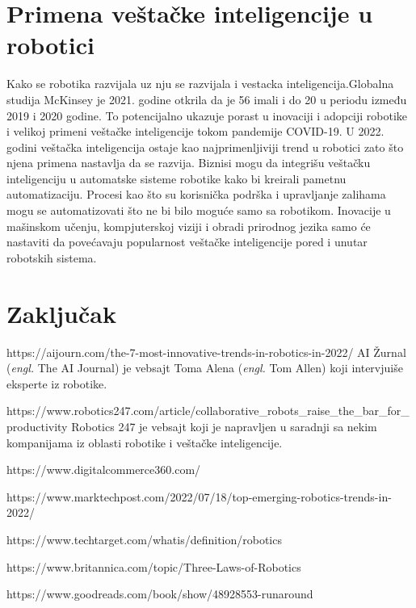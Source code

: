 \documentclass{report}
\begin{document}
\chapter{Primena veštačke inteligencije u robotici}
Kako se robotika razvijala uz nju se razvijala i vestacka inteligencija.Globalna studija McKinsey je 2021. godine
otkrila da je 56%
imali i do 20%
u periodu između 2019 i 2020 godine. To potencijalno ukazuje porast u inovaciji i adopciji robotike i velikoj primeni veštačke inteligencije tokom pandemije COVID-19. U 2022. godini veštačka inteligencija ostaje kao najprimenljiviji trend u robotici zato što njena primena nastavlja da se razvija. Biznisi mogu da integrišu veštačku inteligenciju u automatske sisteme robotike kako bi
kreirali pametnu automatizaciju. Procesi kao što su korisnička podrška i upravljanje zalihama mogu se  automatizovati što ne bi bilo moguće samo sa robotikom. Inovacije u mašinskom učenju, kompjuterskoj viziji i obradi prirodnog jezika samo će nastaviti da povećavaju popularnost veštačke inteligencije pored i unutar robotskih sistema.
	
	\chapter{Zaključak}
	

\begin{thebibliography}{99}
	
	https://aijourn.com/the-7-most-innovative-trends-in-robotics-in-2022/
    AI Žurnal (\emph{engl.} The AI Journal) je vebsajt Toma Alena (\emph{engl.} Tom Allen) koji intervjuiše eksperte iz robotike.
	
	https://www.robotics247.com/article/collaborative\_robots\_raise\_the\_bar\_for\_productivity Robotics 247 je vebsajt koji je napravljen u saradnji sa nekim kompanijama iz oblasti robotike i veštačke inteligencije.
	
	https://www.digitalcommerce360.com/
	
	https://www.marktechpost.com/2022/07/18/top-emerging-robotics-trends-in-2022/
	
	https://www.techtarget.com/whatis/definition/robotics
	
	https://www.britannica.com/topic/Three-Laws-of-Robotics
	
	https://www.goodreads.com/book/show/48928553-runaround
	
\end{thebibliography}
\end{document}
